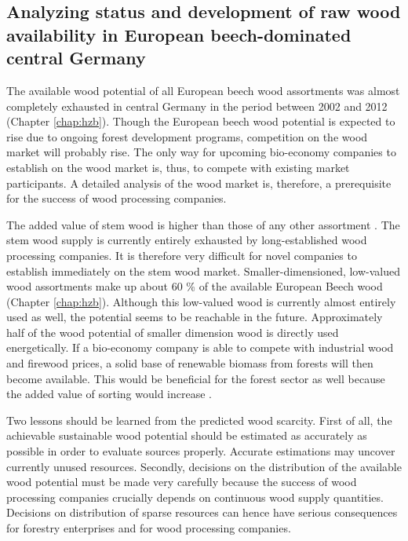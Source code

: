 \subsection{Analyzing status and development of raw wood availability in European beech-dominated central Germany}
\label{subsec:discussion:struct:hzb}
The available wood potential of all European beech wood assortments was almost completely exhausted in central Germany in the period between 2002 and 2012 (Chapter \ref{chap:hzb}). Though the European beech wood potential is expected to rise due to ongoing forest development programs, competition on the wood market will probably rise. The only way for upcoming bio-economy companies to establish on the wood market is, thus, to compete with existing market participants. A detailed analysis of the wood market is, therefore, a prerequisite for the success of wood processing companies.

The added value of stem wood is higher than those of any other assortment \citep{nagel_2008}. The stem wood supply is currently entirely exhausted by long-established wood processing companies. It is therefore very difficult for novel companies to establish immediately on the stem wood market. Smaller-dimensioned, low-valued wood assortments make up about 60 \% of the available European Beech wood (Chapter \ref{chap:hzb}). Although this low-valued wood is currently almost entirely used as well, the potential seems to be reachable in the future. Approximately half of the wood potential of smaller dimension wood is directly used energetically. If a bio-economy company is able to compete with industrial wood and firewood prices, a solid base of renewable biomass from forests will then become available. This would be beneficial for the forest sector as well because the added value of sorting would increase \cite[p. 67]{mohring_1997}.

Two lessons should be learned from the predicted wood scarcity. First of all, the achievable sustainable wood potential should be estimated as accurately as possible in order to evaluate sources properly. Accurate estimations may uncover currently unused resources. Secondly, decisions on the distribution of the available wood potential must be made very carefully because the success of wood processing companies crucially depends on continuous wood supply quantities. Decisions on distribution of sparse resources can hence have serious consequences for forestry enterprises and for wood processing companies.

